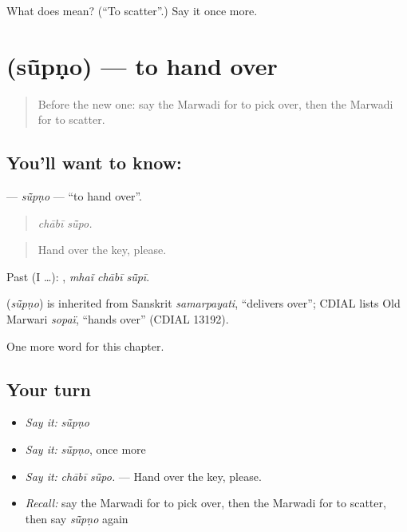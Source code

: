 \begin{tcolorbox}[breakable,colback=teal!4,colframe=teal!35!black,title={Before you move on}]
What does  mean? (\textquotedblleft{}To scatter\textquotedblright{}.) Say it once more.
\end{tcolorbox}
\section[\texorpdfstring{\mw{सूंपणो} (sū̃pṇo)}{सूंपणो (sū̃pṇo)}]{ (sū̃pṇo) — to hand over}

\label{lesson:MW-C178-supno}



\begin{quote}
Before the new one: say the Marwadi for to pick over, then the Marwadi for to scatter.
\end{quote}

\subsection*{You'll want to know: }
\textbf{} — \emph{sū̃pṇo} — \textquotedblleft{}to hand over\textquotedblright{}.

\begin{quote}
 
\end{quote}

\begin{quote}
\emph{chābī sū̃po.}
\end{quote}

\begin{quote}
Hand over the key, please.
\end{quote}

Past (I …):   , \emph{mhaĩ chābī sū̃pī}.

\begin{cousinweb}
\textbf{} (\emph{sū̃pṇo}) is inherited from Sanskrit \emph{samarpayati}, \textquotedblleft{}delivers over\textquotedblright{}; CDIAL lists Old Marwari \emph{sopaï}, \textquotedblleft{}hands over\textquotedblright{} (CDIAL 13192).
\end{cousinweb}

\begin{grammarlens}[title={What you've built}]
One more word for this chapter.
\end{grammarlens}

\subsection*{Your turn}
\begin{itemize}
\raggedright
  \item \emph{Say it:} \emph{sū̃pṇo}
  \item \emph{Say it:} \emph{sū̃pṇo}, once more
  \item \emph{Say it:} \emph{chābī sū̃po.} — Hand over the key, please.
  \item \emph{Recall:} say the Marwadi for to pick over, then the Marwadi for to scatter, then say \emph{sū̃pṇo} again
\end{itemize}

